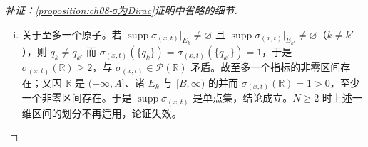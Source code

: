 \documentclass[../../main.tex]{subfiles}%
\begin{document}
\begin{proof}[补证：\cref{proposition:ch08-σ为Dirac}证明中省略的细节]
\begin{enumerate}[(i)]
\begin{align*}
\end{align*}
两端除以 $\sigma^0_{(x,t)}((-\infty,q_0])>0$ 即得 $\sigma_{(x,t)}(\{q_0\})=1$。
\item 关于至多一个原子。若 $\operatorname{supp}\sigma_{(x,t)}|_{E_k}\neq\varnothing$ 且 $\operatorname{supp}\sigma_{(x,t)}|_{E_{k'}}\neq\varnothing$（$k\neq k'$），则 $q_k\neq q_{k'}$ 而 $\sigma_{(x,t)}(\{q_k\})=\sigma_{(x,t)}(\{q_{k'}\})=1$，于是 $\sigma_{(x,t)}(\mathbb{R})\geqslant2$，与 $\sigma_{(x,t)}\in\mathcal{P}(\mathbb{R})$ 矛盾。故至多一个指标的非零区间存在；又因 $\mathbb{R}$ 是 $(-\infty,A]$、诸 $E_k$ 与 $[B,\infty)$ 的并而 $\sigma_{(x,t)}(\mathbb{R})=1>0$，至少一个非零区间存在。于是 $\operatorname{supp}\sigma_{(x,t)}$ 是单点集，结论成立。$N\geqslant2$ 时上述一维区间的划分不再适用，论证失效。
\end{enumerate}
\end{proof}
\end{document}
